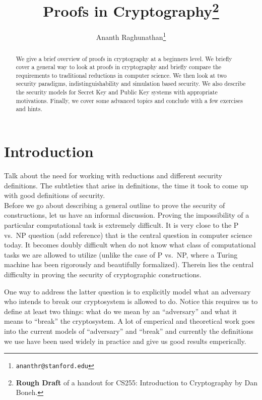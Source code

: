 \documentclass[A4, 11pt]{article}
\newcommand{\todo}[1]{\small{\sc #1}\normalsize}
\begin{document}
\title{Proofs in Cryptography\footnote{{\bf Rough Draft} of a handout for
CS255: Introduction to Cryptography by Dan Boneh.}}
\author{Ananth Raghunathan\thanks{{\tt ananthr@stanford.edu}}}
\date{}
\maketitle

\begin{abstract}
We give a brief overview of proofs in cryptography at a beginners level. We
briefly cover a general way to look at proofs in cryptography and briefly
compare the requirements to traditional reductions in computer science. We
then look at two security paradigms, indistinguishability and simulation
based security. We also describe the security models for Secret Key and
Public Key systems with appropriate motivations. Finally, we cover some
advanced topics and conclude with a few exercises and hints.
\end{abstract}

\section{Introduction}
\todo{Talk about the need for working with reductions and different security
definitions. The subtleties that arise in definitions, the time it took to
come up with good definitions of security.}
\\

Before we go about describing a general outline to prove the security of
constructions, let us have an informal discussion. Proving the
impossibility of a particular computational task is extremely difficult. It
is very close to the P vs.~NP question (\todo{add reference}) that is the central
question in computer science today. It becomes doubly difficult when do not
know what class of computational tasks we are allowed to utilize (unlike
the case of P vs.~NP, where a Turing machine has been rigorously and
beautifully formalized). Therein lies the central difficulty in proving the
security of cryptographic constructions. 

One way to address the latter question is to explicitly model what an
adversary who intends to break our cryptosystem is allowed to do. Notice
this requires us to define at least two things: what do we mean by an
``adversary'' and what it means to ``break'' the cryptosystem. A lot of
emperical and theoretical work goes into the current models of
``adversary'' and ``break'' and currently the definitions we use have been
used widely in practice and give us good results emperically. 
\end{document}
